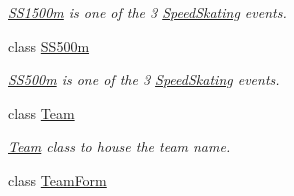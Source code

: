 \begin{DoxyCompactItemize}
\begin{DoxyCompactList}\small\item\em \hyperlink{classProject__Codename__Olympia__v1_1_1__0_1_1SS1500m}{S\+S1500m} is one of the 3 \hyperlink{classProject__Codename__Olympia__v1_1_1__0_1_1SpeedSkating}{Speed\+Skating} events. \end{DoxyCompactList}\item 
class \hyperlink{classProject__Codename__Olympia__v1_1_1__0_1_1SS500m}{S\+S500m}
\begin{DoxyCompactList}\small\item\em \hyperlink{classProject__Codename__Olympia__v1_1_1__0_1_1SS500m}{S\+S500m} is one of the 3 \hyperlink{classProject__Codename__Olympia__v1_1_1__0_1_1SpeedSkating}{Speed\+Skating} events. \end{DoxyCompactList}\item 
class \hyperlink{classProject__Codename__Olympia__v1_1_1__0_1_1Team}{Team}
\begin{DoxyCompactList}\small\item\em \hyperlink{classProject__Codename__Olympia__v1_1_1__0_1_1Team}{Team} class to house the team name. \end{DoxyCompactList}\item 
class \hyperlink{classProject__Codename__Olympia__v1_1_1__0_1_1TeamForm}{Team\+Form}
\end{DoxyCompactItemize}
